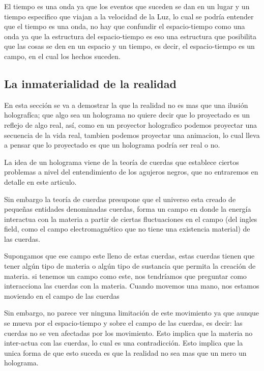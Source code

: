 \documentclass[12pt,letterpaper, a4paper ]{article}
\begin{document}
El tiempo es una onda ya que los eventos que suceden se dan en un lugar y un tiempo especifico que viajan a la velocidad de la Luz, lo cual se podría entender que el tiempo es una onda, no hay que confundir el espacio-tiempo como una onda
ya que la estructura del espacio-tiempo es eso una estructura que posibilita que las cosas se den en un espacio y un tiempo, es decir, el espacio-tiempo es un campo, en el cual los hechos suceden.




\subsection{La inmaterialidad de la realidad}

En esta sección se va a demostrar la que la realidad no es mas que una ilusión holografíca; que algo sea un holograma no quiere decir que lo proyectado es un reflejo de algo real, así, como en un proyector holografico podemos proyectar una secuencia de la vida real, tambien podemos proyectar una animacion, lo cual lleva a pensar
que lo proyectado es que un holograma podría ser real o no. 

La idea de un holograma viene de la teoría de cuerdas que establece ciertos problemas a nivel del entendimiento de los agujeros negros, que no entraremos en detalle en este articulo.

Sin embargo la teoría de cuerdas presupone que el universo esta creado de pequeñas entidades denominadas cuerdas, forma un campo en donde la energía interactua con la materia a partir de ciertas fluctuaciones en el campo (del ingles field, como el campo electromagnético que no tiene una existencia material) de las cuerdas.

Supongamos que ese campo este lleno de estas cuerdas, estas cuerdas tienen que tener algún tipo de materia o algún tipo de sustancia que permita la creación de materia. si tenemos un campo como este, nos tendríamos que preguntar como interacciona las cuerdas con la materia. Cuando movemos una mano, nos estamos moviendo en el campo de las cuerdas

Sin embargo, no parece ver ninguna limitación de este movimiento ya que aunque se mueva por el espacio-tiempo y sobre el campo de las cuerdas, es decir: las cuerdas no se ven afectadas por los movimiento. Esto implica que la materia no inter-actua con las cuerdas, lo cual es una contradicción. Esto implica que la unica forma de que esto suceda
es que la realidad no sea mas que un mero un holograma.
\end{document}
